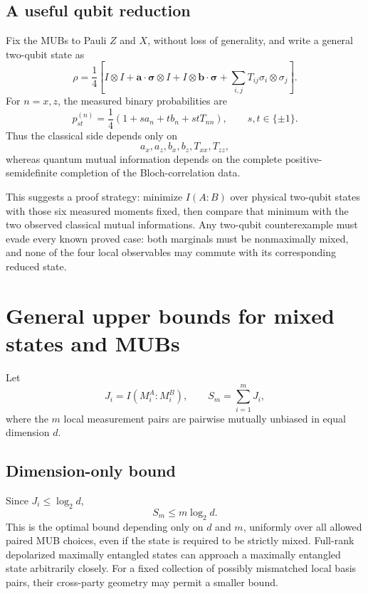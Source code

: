 \subsection{A useful qubit reduction}

Fix the MUBs to Pauli $Z$ and $X$, without loss of generality, and write a general two-qubit state as
\begin{equation}
\rho=\frac14\left[I\otimes I+\mathbf a\cdot\boldsymbol\sigma\otimes I
+I\otimes\mathbf b\cdot\boldsymbol\sigma
+\sum_{i,j}T_{ij}\sigma_i\otimes\sigma_j\right].
\end{equation}
For $n=x,z$, the measured binary probabilities are
\begin{equation}
p_{st}^{(n)}=\frac14\left(1+s a_n+t b_n+stT_{nn}\right),
\qquad s,t\in\{\pm1\}.
\end{equation}
Thus the classical side depends only on
\begin{equation}
a_x,a_z,b_x,b_z,T_{xx},T_{zz},
\end{equation}
whereas quantum mutual information depends on the complete positive-semidefinite completion of the Bloch-correlation data.

This suggests a proof strategy: minimize $I(A:B)$ over physical two-qubit states with those six measured moments fixed, then compare that minimum with the two observed classical mutual informations. Any two-qubit counterexample must evade every known proved case: both marginals must be nonmaximally mixed, and none of the four local observables may commute with its corresponding reduced state.

\section{General upper bounds for mixed states and MUBs}

Let
\begin{equation}
J_i=I(M_i^A:M_i^B),
\qquad
S_m=\sum_{i=1}^{m}J_i,
\end{equation}
where the $m$ local measurement pairs are pairwise mutually unbiased in equal dimension $d$.

\subsection{Dimension-only bound}

Since $J_i\le\log_2d$,
\begin{equation}
S_m\le m\log_2d.
\end{equation}
This is the optimal bound depending only on $d$ and $m$, uniformly over all allowed paired MUB choices, even if the state is required to be strictly mixed. Full-rank depolarized maximally entangled states can approach a maximally entangled state arbitrarily closely. For a fixed collection of possibly mismatched local basis pairs, their cross-party geometry may permit a smaller bound.

